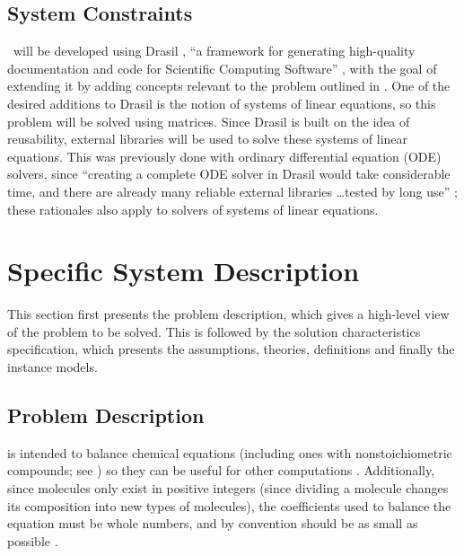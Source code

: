 \documentclass[12pt]{article}
\begin{document}
\subsection{System Constraints} \label{sec_sysConst}


\progname~will be developed using Drasil \cite{carette_drasil_2021}, ``a
framework for generating high-quality documentation and code for Scientific
Computing Software'' \cite[p. iii]{maclachlan_design_2020}, with the goal of
extending it by adding concepts relevant to the problem outlined in
. One of the desired additions to Drasil is the notion of
systems of linear equations, so this problem will be solved using matrices.
Since Drasil is built on the idea of reusability, external libraries will be
used to solve these systems of linear equations. This was previously done with
ordinary differential equation (ODE) solvers, since ``creating a complete ODE
solver in Drasil would take considerable time, and there are already many
reliable external libraries \dots tested by long use''
\cite[p. 24]{chen_solving_2022}; these rationales also apply to solvers of
systems of linear equations.

\section{Specific System Description} \label{sec_specSysDesc}

This section first presents the problem description, which gives a high-level
view of the problem to be solved.  This is followed by the solution characteristics
specification, which presents the assumptions, theories, definitions and finally
the instance models.

\subsection{Problem Description} \label{sec_probDesc}

\progname{} is intended to balance chemical equations (including ones with
nonstoichiometric compounds; see ) so
they can be useful for other computations \cite{lund_introduction_2023}.
Additionally, since molecules only exist in positive integers (since dividing a
molecule changes its composition into new types of molecules), the coefficients
used to balance the equation must be whole
numbers, and by convention should be as small as possible
\cite{lund_introduction_2023}.
\end{document}
